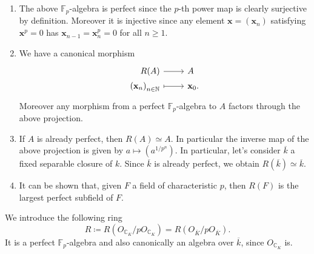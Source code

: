 \begin{rem}[]\leavevmode\vspace{-.2\baselineskip}
\begin{enumerate}
\item The above $\mathbb{F}_p$-algebra is perfect
	since the $p$-th power map is clearly surjective by definition.
	Moreover it is injective since any element $\mathbf{x} = \left( \mathbf{x}_n \right)$
	satisfying $\mathbf{x}^p = 0$ has
	$\mathbf{x}_{n-1} = \mathbf{x}_n^p = 0$ for all $n \geq 1$.

\item We have a canonical morphism
	\begin{equation*}
	\begin{tikzcd}[row sep = 0ex
		,/tikz/column 1/.append style={anchor=base east}
		,/tikz/column 2/.append style={anchor=base west}]
		R(A) \arrow[r, "", rightarrow] &
		A \\
		\left( \mathbf{x}_n \right)_{n \in \mathbb{N}} \arrow[r, "", mapsto] & 
		\mathbf{x}_0
	.\end{tikzcd}
	\end{equation*} 
	Moreover any morphism from a perfect $\mathbb{F}_p$-algebra
	to $A$ factors through the above projection.

\item If $A$ is already perfect, then $R(A) \simeq A$.
	In particular the inverse map of the above projection is given by
	$a \mapsto \left( a^{1/p^n} \right)$.
	In particular, let's consider $\overline{k}$ a fixed separable closure of $k$.
	Since $\overline{k}$ is already perfect, we obtain $R(\overline{k}) \simeq \overline{k}$.

\item It can be shown that, given $F$ a field of characteristic $p$, then $R(F)$ is the largest
	perfect subfield of $F$.
\end{enumerate}
\end{rem}


\begin{ntt}[]
	We introduce the following ring
	\begin{equation*}
		R \coloneqq R(O_{\mathbb{C}_K}/pO_{\mathbb{C}_K}) =
		R(O_{\overline{K}}/pO_{\overline{K}})
	.\end{equation*}
	It is a perfect $\mathbb{F}_p$-algebra and also canonically an
	algebra over $\overline{k}$, since $O_{\mathbb{C}_K}$ is.
\end{ntt}


